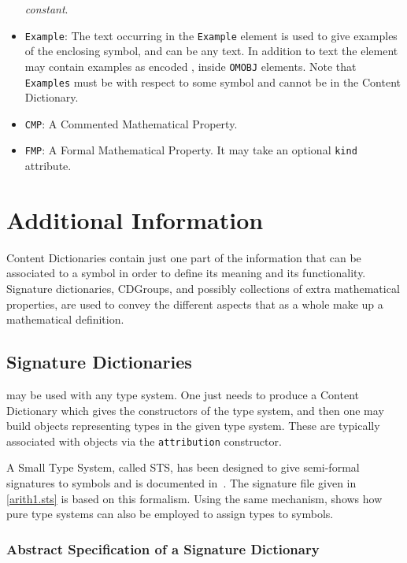 \begin{itemize}
  \emph{constant}.
\item \lstinline|Example|: The text occurring in the \lstinline|Example| element is used
  to give examples of the enclosing symbol, and can be any \XML text. In addition to text
  the element may contain examples as \XML encoded \OM, inside \lstinline|OMOBJ|
  elements.  Note that \lstinline|Examples| must be with respect to some symbol and
  cannot be  in the Content Dictionary.
\item \lstinline|CMP|: A Commented Mathematical Property.
\item \lstinline|FMP|: A Formal Mathematical Property.  It may take an optional
  \lstinline|kind| attribute.
\end{itemize}

\section{Additional Information}\label{addfiles}

Content Dictionaries contain just one part of the information that can be associated to a
symbol in order to define its meaning and its functionality. \OM Signature dictionaries,
CDGroups, and possibly collections of extra mathematical properties, are used to convey
the different aspects that as a whole make up a mathematical definition.

\subsection{Signature Dictionaries}\label{sigfiles}

\OM may be used with any type system. One just needs to produce a Content Dictionary which
gives the constructors of the type system, and then one may build \OM objects representing
types in the given type system. These are typically associated with \OM objects via the
\OM \lstinline|attribution| constructor.

A Small Type System, called STS, has been designed to give semi-formal signatures to \OM
symbols and is documented in~\cite{OM_D132c}.  The signature file given in
\ref{arith1.sts} is based on this formalism. Using the same mechanism, \cite{OMD132b}
shows how pure type systems can also be employed to assign types to \OM symbols.

\subsubsection{Abstract Specification  of a Signature Dictionary}\label{sect_sigpcdata}

